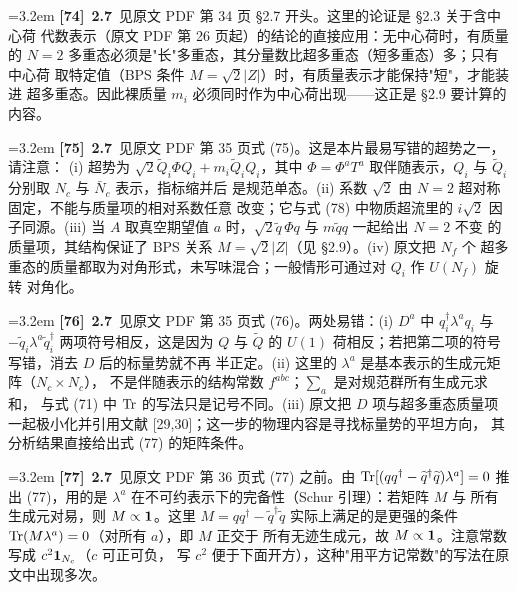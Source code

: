 \par
\par\medskip\noindent\hangindent=3.2em \textbf{[74]}~\textbf{2.7}~见原文 PDF 第 34 页 §2.7 开头。这里的论证是 §2.3 关于含中心荷 代数表示（原文 PDF 第 26 页起）的结论的直接应用：无中心荷时，有质量的 $N=2$ 多重态必须是"长"多重态，其分量数比超多重态（短多重态）多；只有中心荷 取特定值（BPS 条件 $M=\sqrt{2}|Z|$）时，有质量表示才能保持"短"，才能装进 超多重态。因此裸质量 $m_i$ 必须同时作为中心荷出现——这正是 §2.9 要计算的内容。
\par
\par\medskip\noindent\hangindent=3.2em \textbf{[75]}~\textbf{2.7}~见原文 PDF 第 35 页式 (75)。这是本片最易写错的超势之一，请注意： (i) 超势为 $\sqrt{2}\widetilde Q_i\Phi Q_i+m_i\widetilde Q_iQ_i$，其中 $\Phi=\Phi^aT^a$ 取伴随表示，$Q_i$ 与 $\widetilde Q_i$ 分别取 $N_c$ 与 $\bar N_c$ 表示，指标缩并后 是规范单态。(ii) 系数 $\sqrt2$ 由 $N=2$ 超对称固定，不能与质量项的相对系数任意 改变；它与式 (78) 中物质超流里的 $i\sqrt2$ 因子同源。(iii) 当 $A$ 取真空期望值 $a$ 时，$\sqrt2\widetilde q\,\Phi q$ 与 $m\widetilde q q$ 一起给出 $N=2$ 不变 的质量项，其结构保证了 BPS 关系 $M=\sqrt2|Z|$（见 §2.9）。(iv) 原文把 $N_f$ 个 超多重态的质量都取为对角形式，未写味混合；一般情形可通过对 $Q_i$ 作 $U(N_f)$ 旋转 对角化。
\par
\par\medskip\noindent\hangindent=3.2em \textbf{[76]}~\textbf{2.7}~见原文 PDF 第 35 页式 (76)。两处易错：(i) $D^a$ 中 $q^\dagger_i\lambda^a q_i$ 与 $-\widetilde q_i\lambda^a\widetilde q_i^\dagger$ 两项符号相反，这是因为 $Q$ 与 $\widetilde Q$ 的 $U(1)$ 荷相反；若把第二项的符号写错，消去 $D$ 后的标量势就不再 半正定。(ii) 这里的 $\lambda^a$ 是基本表示的生成元矩阵（$N_c\times N_c$）， 不是伴随表示的结构常数 $f^{abc}$；$\sum_a$ 是对规范群所有生成元求和， 与式 (71) 中 ${\rm Tr}$ 的写法只是记号不同。(iii) 原文把 $D$ 项与超多重态质量项 一起极小化并引用文献 [29,30]；这一步的物理内容是寻找标量势的平坦方向， 其分析结果直接给出式 (77) 的矩阵条件。
\par
\par\medskip\noindent\hangindent=3.2em \textbf{[77]}~\textbf{2.7}~见原文 PDF 第 36 页式 (77) 之前。由 ${\rm Tr}[(qq^\dagger-\widetilde q^\dagger\widetilde q)\lambda^a]=0$ 推出 (77)，用的是 $\lambda^a$ 在不可约表示下的完备性（Schur 引理）：若矩阵 $M$ 与 所有生成元对易，则 $M\propto{\bf 1}$。这里 $M=qq^\dagger-\widetilde q^\dagger\widetilde q$ 实际上满足的是更强的条件 ${\rm Tr}(M\lambda^a)=0$（对所有 $a$），即 $M$ 正交于 所有无迹生成元，故 $M\propto{\bf 1}$。注意常数写成 $c^2{\bf 1}_{N_c}$（$c$ 可正可负， 写 $c^2$ 便于下面开方），这种"用平方记常数"的写法在原文中出现多次。
